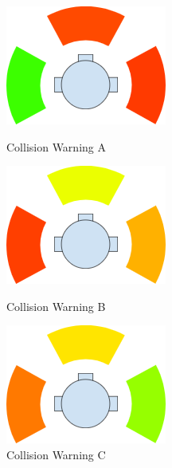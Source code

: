 \documentclass[onecolumn, oneside, letterpaper, draftclsnofoot, 10pt, compsoc]{IEEEtran}
\begin{document}
\begin{figure}[!htb]
  \includegraphics[width=\linewidth]{graphics/collision_warning1.png}
  \caption{Collision Warning A}
  \label{fig:cw1}
\endminipage\hfill
{}
  \includegraphics[width=\linewidth]{graphics/collision_warning2.png}
  \caption{Collision Warning B}
  \label{fig:cw2}
\endminipage\hfill
{}%
  \includegraphics[width=\linewidth]{graphics/collision_warning3.png}
  \caption{Collision Warning C}
  \label{fig:cw3}
\endminipage
\end{figure}
\end{document}
